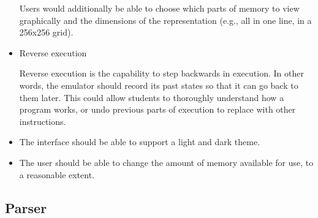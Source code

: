 \documentclass[
    paper=letter,
    parskip=half,
    fontsize=12pt,
    titlepage=firstiscover,
    toc=bibliography,
    numbers=endperiod
]{scrartcl}
\begin{document}
\begin{itemize}
          Users would additionally be able to choose which parts of memory to view
          graphically and the dimensions of the representation (e.g., all in one
          line, in a 256x256 grid).

    \item Reverse execution

          Reverse execution is the capability to step backwards in execution. In
          other words, the emulator should record its past states so that it can
          go back to them later. This could allow students to thoroughly
          understand how a program works, or undo previous parts of execution to
          replace with other instructions.
    \item The interface should be able to support a light and dark theme.
    \item The user should be able to change the amount of memory available for
          use, to a reasonable extent.
\end{itemize}

\subsection{Parser}
\end{document}

